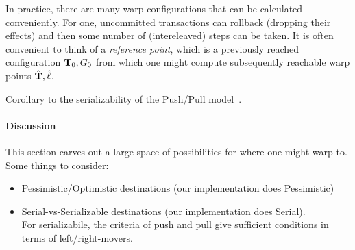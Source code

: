 


In practice, there are many warp configurations that can be calculated
conveniently. For one, uncommitted transactions can rollback (dropping
their effects) and then some number of (intereleaved) steps can be taken.
%
It is often convenient to think of a \emph{reference point}, which is
a previously reached configuration $\mathbf{T}_0,G_0$ from which one might
compute subsequently reachable warp points $\hat{\mathbf{T}},\hat{\ell}$.


    
\begin{theorem}[Serializability]
Corollary to the serializability of the Push/Pull model~\cite{pmpy}.
\end{theorem}


\paragraph{Discussion}

This section carves out a large space of possibilities for where one
might warp to. Some things to consider:

\begin{itemize}
\item Pessimistic/Optimistic destinations 
  (our implementation does Pessimistic)
\item Serial-vs-Serializable destinations
  (our implementation does Serial).\\
  For serializabile, the criteria of {\sc push} and {\sc pull} give
  sufficient conditions in terms of left/right-movers.
\end{itemize}



